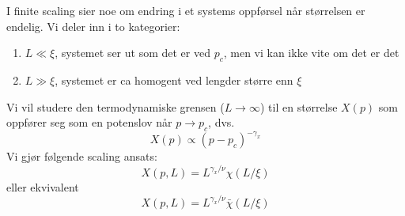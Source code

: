 \documentclass[english, a4paper]{article}
\begin{document}
\noindent
I finite scaling sier noe om endring i et systems oppførsel når størrelsen er endelig. 
Vi deler inn i to kategorier:
\begin{enumerate}
 \item $L \ll \xi$, systemet ser ut som det er ved $p_c$, men vi kan ikke vite om det er det
 \item $L \gg \xi$, systemet er ca homogent ved lengder større enn $\xi$
\end{enumerate}
Vi vil studere den termodynamiske grensen ($L \to \infty$) til en størrelse $X(p)$ som
oppfører seg som en potenslov når $p \to p_c$, dvs. 
\begin{equation}
 X(p) \propto (p-p_c)^{-\gamma_x}
\end{equation}
Vi gjør følgende scaling ansats:
\begin{equation}
 X(p, L) = L^{\gamma_x/\nu} \chi(L/\xi)
\end{equation}
eller ekvivalent
\begin{equation}
 X(p,L) = L^{\gamma_x/\nu} \bar{\chi}(L/\xi)
\end{equation}
 
\end{document}
